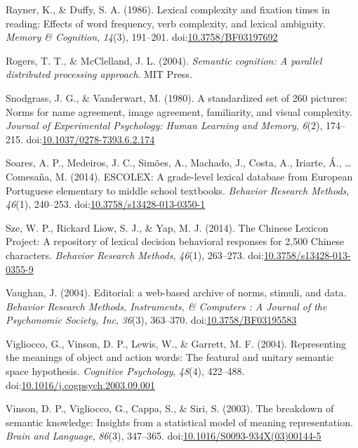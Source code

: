 \documentclass[english,man]{apa6}
\theoremstyle{definition}
\theoremstyle{definition}
\theoremstyle{definition}
\theoremstyle{remark}
\begin{document}
\hypertarget{ref-Rayner1986}{}
Rayner, K., \& Duffy, S. A. (1986). Lexical complexity and fixation
times in reading: Effects of word frequency, verb complexity, and
lexical ambiguity. \emph{Memory \& Cognition}, \emph{14}(3), 191--201.
doi:\href{https://doi.org/10.3758/BF03197692}{10.3758/BF03197692}

\hypertarget{ref-Rogers2004}{}
Rogers, T. T., \& McClelland, J. L. (2004). \emph{Semantic cognition: A
parallel distributed processing approach}. MIT Press.

\hypertarget{ref-Snodgrass1980}{}
Snodgrass, J. G., \& Vanderwart, M. (1980). A standardized set of 260
pictures: Norms for name agreement, image agreement, familiarity, and
visual complexity. \emph{Journal of Experimental Psychology: Human
Learning and Memory}, \emph{6}(2), 174--215.
doi:\href{https://doi.org/10.1037/0278-7393.6.2.174}{10.1037/0278-7393.6.2.174}

\hypertarget{ref-Soares2014}{}
Soares, A. P., Medeiros, J. C., Simões, A., Machado, J., Costa, A.,
Iriarte, Á., \ldots{} Comesaña, M. (2014). ESCOLEX: A grade-level
lexical database from European Portuguese elementary to middle school
textbooks. \emph{Behavior Research Methods}, \emph{46}(1), 240--253.
doi:\href{https://doi.org/10.3758/s13428-013-0350-1}{10.3758/s13428-013-0350-1}

\hypertarget{ref-Sze2014}{}
Sze, W. P., Rickard Liow, S. J., \& Yap, M. J. (2014). The Chinese
Lexicon Project: A repository of lexical decision behavioral responses
for 2,500 Chinese characters. \emph{Behavior Research Methods},
\emph{46}(1), 263--273.
doi:\href{https://doi.org/10.3758/s13428-013-0355-9}{10.3758/s13428-013-0355-9}

\hypertarget{ref-Vaughan2004}{}
Vaughan, J. (2004). Editorial: a web-based archive of norms, stimuli,
and data. \emph{Behavior Research Methods, Instruments, \& Computers : A
Journal of the Psychonomic Society, Inc}, \emph{36}(3), 363--370.
doi:\href{https://doi.org/10.3758/BF03195583}{10.3758/BF03195583}

\hypertarget{ref-Vigliocco2004}{}
Vigliocco, G., Vinson, D. P., Lewis, W., \& Garrett, M. F. (2004).
Representing the meanings of object and action words: The featural and
unitary semantic space hypothesis. \emph{Cognitive Psychology},
\emph{48}(4), 422--488.
doi:\href{https://doi.org/10.1016/j.cogpsych.2003.09.001}{10.1016/j.cogpsych.2003.09.001}

\hypertarget{ref-Vinson2003}{}
Vinson, D. P., Vigliocco, G., Cappa, S., \& Siri, S. (2003). The
breakdown of semantic knowledge: Insights from a statistical model of
meaning representation. \emph{Brain and Language}, \emph{86}(3),
347--365.
doi:\href{https://doi.org/10.1016/S0093-934X(03)00144-5}{10.1016/S0093-934X(03)00144-5}
\end{document}
